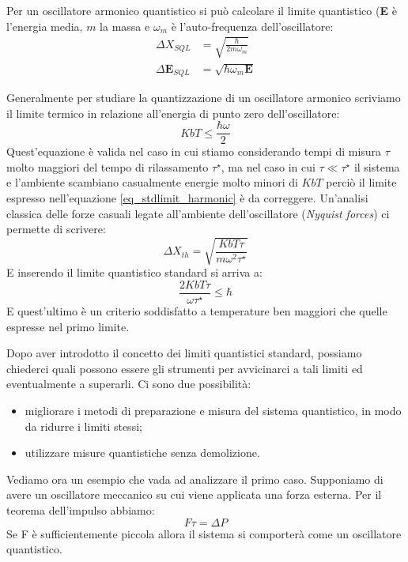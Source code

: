 \begin{esempio}
    
    Per un oscillatore armonico quantistico si può calcolare il limite quantistico (\textbf{E} è l'energia media, $m$ la massa e $\omega_m$ è l'auto-frequenza dell'oscillatore:
    \begin{align*}
        \Delta X_{SQL} &= \sqrt{\frac{\hbar}{2m \omega_m}} \\
        \Delta \mathbf{E}_{SQL} &= \sqrt{\hbar \omega_m \mathbf{E}}
    \end{align*}
    
    \noindent Generalmente per studiare la quantizzazione di un oscillatore armonico scriviamo il limite termico in relazione  all'energia di punto zero dell'oscillatore:
    \begin{equation}\label{eq_stdlimit_harmonic}
        Kb T \le \frac{\hbar \omega}{2}
    \end{equation}
    Quest'equazione è valida nel caso in cui stiamo considerando tempi di misura $\tau$ molto maggiori del tempo di rilassamento $\tau^\star$, ma nel caso in cui $\tau \ll \tau^\star$ il sistema e l'ambiente scambiano casualmente energie molto minori di $KbT$ perciò il limite espresso nell'equazione \ref{eq_stdlimit_harmonic} è da correggere. Un'analisi classica delle forze casuali legate all'ambiente dell'oscillatore (\textit{Nyquist forces}) ci permette di scrivere: 
    \begin{equation*}
        \Delta X_{th} = \sqrt{\frac{Kb T \tau}{m\omega^2 \tau^\star}} 
    \end{equation*}
    E inserendo il limite quantistico standard si arriva a:
    \begin{equation*}
        \frac{2 K b T \tau}{\omega \tau^\star} \le \hbar
    \end{equation*}
    E quest'ultimo è un criterio soddisfatto a temperature ben maggiori che quelle espresse nel primo limite.
\end{esempio}

\noindent Dopo aver introdotto il concetto dei limiti quantistici standard, possiamo chiederci quali possono essere gli strumenti per avvicinarci a tali limiti ed eventualmente a superarli. Ci sono due possibilità:
\begin{itemize}
    \item migliorare i metodi di preparazione e misura del sistema quantistico, in modo da ridurre i limiti stessi;
    \item utilizzare misure quantistiche senza demolizione.
\end{itemize}
Vediamo ora un esempio che vada ad analizzare il primo caso. Supponiamo di avere un oscillatore meccanico su cui viene applicata una forza esterna. Per il teorema dell'impulso abbiamo:
\begin{equation*}
    F \tau = \Delta P
\end{equation*}
Se F è sufficientemente piccola allora il sistema si comporterà come un oscillatore quantistico.


